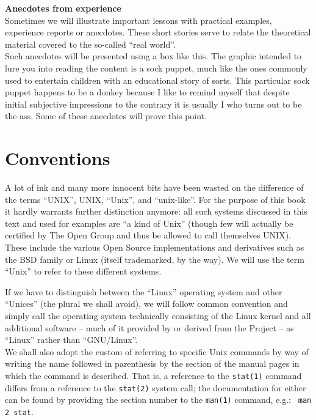 \begin{experience}
{\bf Anecdotes from experience} \\
Sometimes we will illustrate important lessons with practical examples,
experience reports or anecdotes.  These short stories serve to relate the
theoretical material covered to the so-called ``real world''. \\[10pt]

Such anecdotes will be presented using a box like this.  The graphic
intended to lure you into reading the content is a sock puppet, much like
the ones commonly used to entertain children with an educational story of
sorts.  This particular sock puppet happens to be a donkey because I like
to remind myself that despite initial subjective impressions to the
contrary it is usually I who turns out to be the ass.  Some of these
anecdotes will prove this point.
\end{experience}


\section*{Conventions}

A lot of ink and many more innocent bits have been
wasted on the difference of the terms
``\textsc{UNIX}\textregistered{}'',
\textsc{UNIX}, ``Unix'', and ``unix-like''.  For the
purpose of this book it hardly warrants further
distinction anymore: all such systems discussed in
this text and used for examples are ``a kind of Unix''
(though few will actually be certified by The Open
Group and thus be allowed to
call themselves \textsc{UNIX}\textregistered).  These
include the various Open Source
implementations and derivatives such as the
BSD family or Linux (itself
trademarked, by the way).  We will use the term
``Unix'' to refer to these different systems.

If we have to distinguish between the ``Linux''
operating system and other ``Unices'' (the plural we
shall avoid), we will follow common convention and
simply call the operating system technically
consisting of the Linux kernel and all additional
software -- much of it provided by or derived from the
 Project -- as
``Linux'' rather than ``GNU/Linux''.
\\

We shall also adopt the custom of referring to
specific Unix commands by way of writing the name
followed in parenthesis by the section of the manual
pages in which the command is described.  That is, a
reference to the {\tt stat(1)} command differs from a
reference to the {\tt stat(2)} system call; the
documentation for either can be found by providing the
section number to the {\tt man(1)} command, e.g.: {\tt
man 2 stat}.

